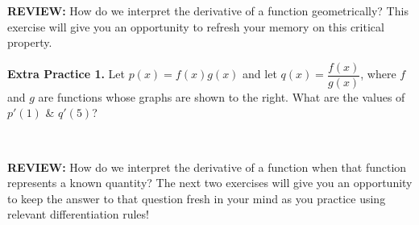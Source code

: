 \documentclass[10pt]{article}
\begin{document}
{\bf REVIEW:} How do we interpret the derivative of a function geometrically? This exercise will give you an opportunity to refresh your memory on this critical property.

\begin{minipage}[t]{0.55\textwidth}
{\bf\color{blue} Extra Practice 1.} %
Let $p(x)=f(x)g(x)$ and let $q(x)=\dfrac{f(x)}{g(x)}$, where $f$ and $g$ are functions whose graphs are shown to the right. What are the values of $p'(1)$ \& $q'(5)$? \\
\end{minipage}
\hfill
\begin{minipage}[t]{0.4\textwidth}
\,
\begin{center}
\end{center}
\end{minipage}


\vfill

\newpage%

{\bf REVIEW:} How do we interpret the derivative of a function when that function represents a known quantity? The next two exercises will give you an opportunity to keep the answer to that question fresh in your mind as you practice using relevant differentiation rules!\\
\end{document}
